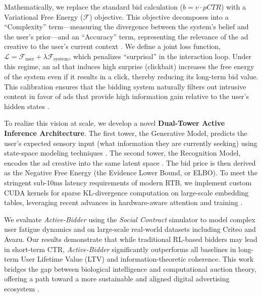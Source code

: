 Mathematically, we replace the standard bid calculation ($b = v \cdot pCTR$) with a Variational Free Energy ($\mathcal{F}$) objective. This objective decomposes into a ``Complexity'' term—measuring the divergence between the system's belief and the user's prior—and an ``Accuracy'' term, representing the relevance of the ad creative to the user's current context \citep{kingma2014adam, goodfellow2014generative}. We define a joint loss function, $\mathcal{L} = \mathcal{F}_{\text{user}} + \lambda \mathcal{F}_{\text{system}}$, which penalizes ``surprisal'' in the interaction loop. Under this regime, an ad that induces high surprise (clickbait) increases the free energy of the system even if it results in a click, thereby reducing its long-term bid value. This calibration ensures that the bidding system naturally filters out intrusive content in favor of ads that provide high information gain relative to the user's hidden states \citep{kovachki2023neural, smith2024scaling}.

To realize this vision at scale, we develop a novel \textbf{Dual-Tower Active Inference Architecture}. The first tower, the Generative Model, predicts the user's expected sensory input (what information they are currently seeking) using state-space modeling techniques \citep{gu2023mamba, vaswani2023evolution}. The second tower, the Recognition Model, encodes the ad creative into the same latent space \citep{radford2021learning}. The bid price is then derived as the Negative Free Energy (the Evidence Lower Bound, or ELBO). To meet the stringent sub-10ms latency requirements of modern RTB, we implement custom CUDA kernels for sparse KL-divergence computation on large-scale embedding tables, leveraging recent advances in hardware-aware attention and training \citep{dao2023flashattention, sun2024learning, reid2024llama}.

We evaluate \textit{Active-Bidder} using the \textit{Social Contract} simulator to model complex user fatigue dynamics and on large-scale real-world datasets including Criteo and Avazu. Our results demonstrate that while traditional RL-based bidders \citep{sutton2018reinforcement} may lead in short-term CTR, \textit{Active-Bidder} significantly outperforms all baselines in long-term User Lifetime Value (LTV) and information-theoretic coherence. This work bridges the gap between biological intelligence and computational auction theory, offering a path toward a more sustainable and aligned digital advertising ecosystem \citep{wu2024ai, wang2024generalist}.


